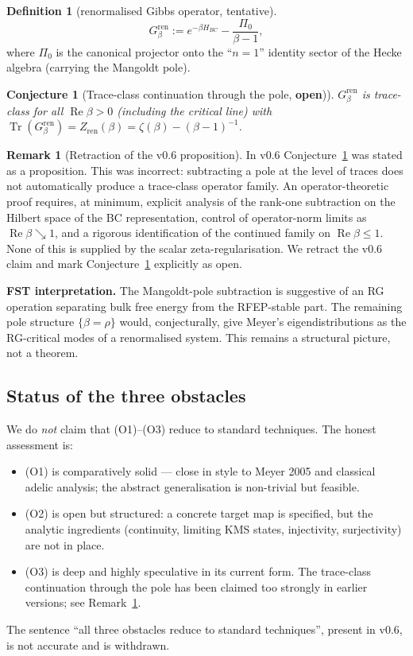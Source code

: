 \documentclass[11pt,a4paper]{article}
\theoremstyle{plain}
\newtheorem{conjecture}[theorem]{Conjecture}
\theoremstyle{definition}
\newtheorem{definition}[theorem]{Definition}
\newtheorem{remark}[theorem]{Remark}
\DeclareMathOperator{\Tr}{Tr}
\renewcommand{\Re}{\operatorname{Re}}
\begin{document}
\begin{definition}[renormalised Gibbs operator, tentative]
\label{def:ren-gibbs}
\[
  G_\beta^{\mathrm{ren}} := e^{-\beta H_{BC}}
    - \frac{\Pi_0}{\beta - 1},
\]
where $\Pi_0$ is the canonical projector onto the
``$n = 1$'' identity sector of the Hecke algebra (carrying the
Mangoldt pole).
\end{definition}

\begin{conjecture}[Trace-class continuation through the pole,
\textbf{open})]
\label{conj:ren-trace-class}
$G_\beta^{\mathrm{ren}}$ is trace-class for all $\Re\beta > 0$
(including the critical line) with
$\Tr(G_\beta^{\mathrm{ren}}) = Z_{\mathrm{ren}}(\beta) = \zeta(\beta)
- (\beta - 1)^{-1}$.
\end{conjecture}

\begin{remark}[Retraction of the v0.6 proposition]
\label{rem:o3-retraction}
In v0.6 Conjecture~\ref{conj:ren-trace-class} was stated as a
proposition.  This was incorrect: subtracting a pole at the level
of traces does not automatically produce a trace-class operator
family.  An operator-theoretic proof requires, at minimum, explicit
analysis of the rank-one subtraction on the Hilbert space of the BC
representation, control of operator-norm limits as $\Re\beta
\searrow 1$, and a rigorous identification of the continued family
on $\Re\beta \le 1$.  None of this is supplied by the scalar
zeta-regularisation.  We retract the v0.6 claim and mark
Conjecture~\ref{conj:ren-trace-class} explicitly as open.
\end{remark}

\textbf{FST interpretation.}  The Mangoldt-pole subtraction is
suggestive of an RG operation separating bulk free energy from the
RFEP-stable part.  The remaining pole structure $\{\beta = \rho\}$
would, conjecturally, give Meyer's eigendistributions as the
RG-critical modes of a renormalised system.  This remains a
structural picture, not a theorem.

\subsection{Status of the three obstacles}

We do \emph{not} claim that (O1)--(O3) reduce to standard techniques.
The honest assessment is:
\begin{itemize}[leftmargin=*]
\item (O1) is comparatively solid --- close in style to Meyer 2005
  and classical adelic analysis; the abstract generalisation is
  non-trivial but feasible.
\item (O2) is open but structured: a concrete target map is
  specified, but the analytic ingredients (continuity, limiting KMS
  states, injectivity, surjectivity) are not in place.
\item (O3) is deep and highly speculative in its current form.  The
  trace-class continuation through the pole has been claimed too
  strongly in earlier versions; see Remark~\ref{rem:o3-retraction}.
\end{itemize}
The sentence ``all three obstacles reduce to standard techniques'',
present in v0.6, is not accurate and is withdrawn.
\end{document}
